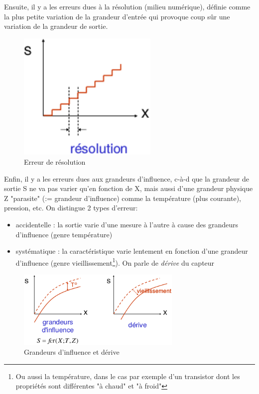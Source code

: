 Ensuite, il y a les erreurs dues à la résolution (milieu numérique), définie comme la plus petite variation de la grandeur d'entrée qui provoque coup sûr une variation de la grandeur de sortie.
\begin{figure}[H] 
	\centering 
	\includegraphics[width=0.6\textwidth,height=8\baselineskip,keepaspectratio]{ch2/image7}
	\caption{Erreur de résolution}
\end{figure}
Enfin, il y a les erreurs dues aux grandeurs d'influence, c-à-d que la grandeur de sortie S ne va pas varier qu'en fonction de X, mais aussi d'une grandeur physique Z "parasite" (:= grandeur d'influence) comme la température (plus courante), pression, etc. On distingue 2 types d'erreur:
\begin{itemize}
	\item accidentelle : la sortie varie d'une mesure à l'autre à cause des grandeurs d'influence (genre température)
	\item systématique : la caractéristique varie lentement en fonction d'une grandeur d'influence (genre vieillissement\footnote{Ou aussi la température, dans le cas par exemple d'un transistor dont les propriétés sont différentes "à chaud" et "à froid"}). On parle de \emph{dérive} du capteur
\end{itemize}
\begin{figure}[H] 
	\centering 
	\includegraphics[width=0.7\textwidth,height=10\baselineskip,keepaspectratio]{ch2/image8}
	\caption{Grandeurs d'influence et dérive}
\end{figure}
